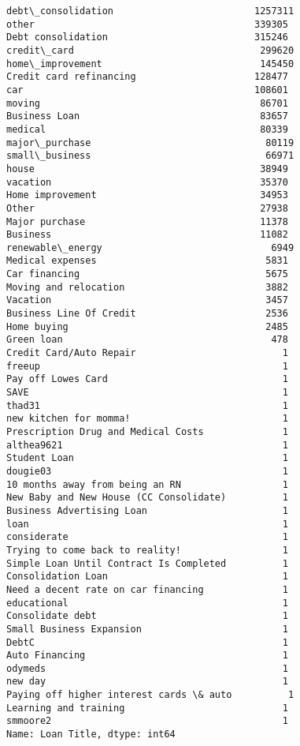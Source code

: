 \documentclass[11pt]{article}
\begin{document}
    \begin{Verbatim}[commandchars=\\\{\},fontsize=\footnotesize]
debt\_consolidation                         1257311
other                                       339305
Debt consolidation                          315246
credit\_card                                 299620
home\_improvement                            145450
Credit card refinancing                     128477
car                                         108601
moving                                       86701
Business Loan                                83657
medical                                      80339
major\_purchase                               80119
small\_business                               66971
house                                        38949
vacation                                     35370
Home improvement                             34953
Other                                        27938
Major purchase                               11378
Business                                     11082
renewable\_energy                              6949
Medical expenses                              5831
Car financing                                 5675
Moving and relocation                         3882
Vacation                                      3457
Business Line Of Credit                       2536
Home buying                                   2485
Green loan                                     478
Credit Card/Auto Repair                          1
freeup                                           1
Pay off Lowes Card                               1
SAVE                                             1
thad31                                           1
new kitchen for momma!                           1
Prescription Drug and Medical Costs              1
althea9621                                       1
Student Loan                                     1
dougie03                                         1
10 months away from being an RN                  1
New Baby and New House (CC Consolidate)          1
Business Advertising Loan                        1
loan                                             1
considerate                                      1
Trying to come back to reality!                  1
Simple Loan Until Contract Is Completed          1
Consolidation Loan                               1
Need a decent rate on car financing              1
educational                                      1
Consolidate debt                                 1
Small Business Expansion                         1
DebtC                                            1
Auto Financing                                   1
odymeds                                          1
new day                                          1
Paying off higher interest cards \& auto          1
Learning and training                            1
smmoore2                                         1
Name: Loan Title, dtype: int64

    \end{Verbatim}
\end{document}
